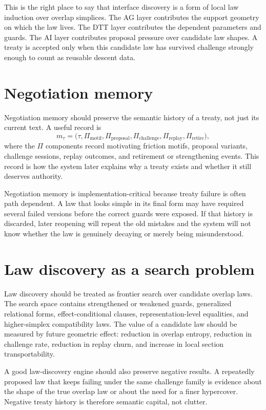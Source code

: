 \documentclass[11pt]{report}
\begin{document}
This is the right place to say that interface discovery is a form of local law induction over overlap simplices. The AG layer contributes the support geometry on which the law lives. The DTT layer contributes the dependent parameters and guards. The AI layer contributes proposal pressure over candidate law shapes. A treaty is accepted only when this candidate law has survived challenge strongly enough to count as reusable descent data.

\section{Negotiation memory}
Negotiation memory should preserve the semantic history of a treaty, not just its current text. A useful record is
\[
m_\tau
=
\bigl(
\tau,
\Pi_{\mathrm{motif}},
\Pi_{\mathrm{proposal}},
\Pi_{\mathrm{challenge}},
\Pi_{\mathrm{replay}},
\Pi_{\mathrm{retire}}
\bigr),
\]
where the $\Pi$ components record motivating friction motifs, proposal variants, challenge sessions, replay outcomes, and retirement or strengthening events. This record is how the system later explains why a treaty exists and whether it still deserves authority.

Negotiation memory is implementation-critical because treaty failure is often path dependent. A law that looks simple in its final form may have required several failed versions before the correct guards were exposed. If that history is discarded, later reopening will repeat the old mistakes and the system will not know whether the law is genuinely decaying or merely being misunderstood.

\section{Law discovery as a search problem}
Law discovery should be treated as frontier search over candidate overlap laws. The search space contains strengthened or weakened guards, generalized relational forms, effect-conditional clauses, representation-level equalities, and higher-simplex compatibility laws. The value of a candidate law should be measured by future geometric effect: reduction in overlap entropy, reduction in challenge rate, reduction in replay churn, and increase in local section transportability.

A good law-discovery engine should also preserve negative results. A repeatedly proposed law that keeps failing under the same challenge family is evidence about the shape of the true overlap law or about the need for a finer hypercover. Negative treaty history is therefore semantic capital, not clutter.
\end{document}
